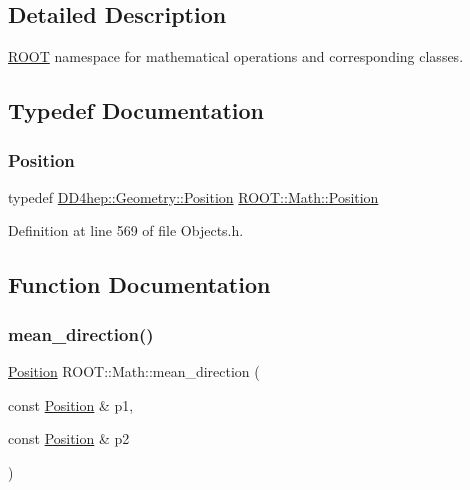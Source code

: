 \subsection{Detailed Description}
\hyperlink{namespace_r_o_o_t}{R\+O\+OT} namespace for mathematical operations and corresponding classes. 

\subsection{Typedef Documentation}
\hypertarget{namespace_r_o_o_t_1_1_math_ac2622efe8212cb8b8a8893efd5117de8}{}\label{namespace_r_o_o_t_1_1_math_ac2622efe8212cb8b8a8893efd5117de8} 
\subsubsection{\texorpdfstring{Position}{Position}}
{\footnotesize\ttfamily typedef \hyperlink{namespace_d_d4hep_1_1_geometry_a55083902099d03506c6db01b80404900}{D\+D4hep\+::\+Geometry\+::\+Position} \hyperlink{namespace_r_o_o_t_1_1_math_ac2622efe8212cb8b8a8893efd5117de8}{R\+O\+O\+T\+::\+Math\+::\+Position}}



Definition at line 569 of file Objects.\+h.



\subsection{Function Documentation}
\hypertarget{namespace_r_o_o_t_1_1_math_a06af24d8ff174f2f4d14850e63adc68f}{}\label{namespace_r_o_o_t_1_1_math_a06af24d8ff174f2f4d14850e63adc68f} 
\subsubsection{\texorpdfstring{mean\+\_\+direction()}{mean\_direction()}}
{\footnotesize\ttfamily \hyperlink{namespace_r_o_o_t_1_1_math_ac2622efe8212cb8b8a8893efd5117de8}{Position} R\+O\+O\+T\+::\+Math\+::mean\+\_\+direction (\begin{DoxyParamCaption}\item[{const \hyperlink{namespace_r_o_o_t_1_1_math_ac2622efe8212cb8b8a8893efd5117de8}{Position} \&}]{p1,  }\item[{const \hyperlink{namespace_r_o_o_t_1_1_math_ac2622efe8212cb8b8a8893efd5117de8}{Position} \&}]{p2 }\end{DoxyParamCaption})\hspace{0.3cm}{\ttfamily [inline]}}



